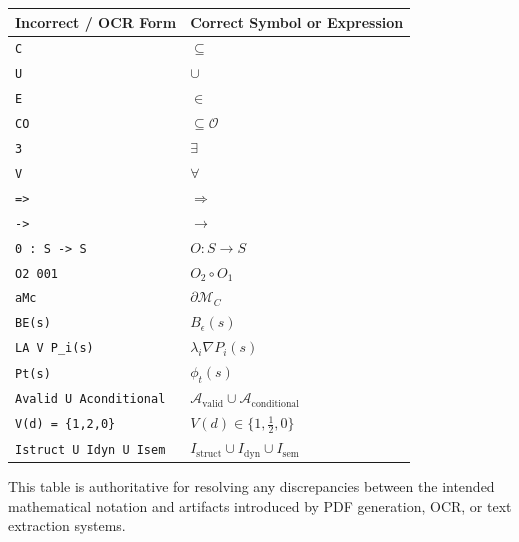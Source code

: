 \documentclass[12pt]{article}
\begin{document}
\begin{center}
\begin{tabular}{ll}
\textbf{Incorrect / OCR Form} & \textbf{Correct Symbol or Expression} \\
\hline
\texttt{C} & $\subseteq$ \\
\texttt{U} & $\cup$ \\
\texttt{E} & $\in$ \\
\texttt{CO} & $\subseteq \mathcal{O}$ \\
\texttt{3} & $\exists$ \\
\texttt{V} & $\forall$ \\
\texttt{=>} & $\Rightarrow$ \\
\texttt{->} & $\to$ \\
\texttt{0 : S -> S} & $O : S \to S$ \\
\texttt{O2 001} & $O_2 \circ O_1$ \\
\texttt{aMc} & $\partial \mathcal{M}_C$ \\
\texttt{BE(s)} & $B_\epsilon(s)$ \\
\texttt{LA V P\_i(s)} & $\lambda_i \nabla P_i(s)$ \\
\texttt{Pt(s)} & $\phi_t(s)$ \\
\texttt{Avalid U Aconditional} & $\mathcal{A}_{\mathrm{valid}} \cup \mathcal{A}_{\mathrm{conditional}}$ \\
\texttt{V(d) = \{1,2,0\}} & $V(d) \in \{1, \tfrac12, 0\}$ \\
\texttt{Istruct U Idyn U Isem} & $I_{\mathrm{struct}} \cup I_{\mathrm{dyn}} \cup I_{\mathrm{sem}}$ \\
\end{tabular}
\end{center}

This table is authoritative for resolving any discrepancies between the intended
mathematical notation and artifacts introduced by PDF generation, OCR, or text
extraction systems.
\end{document}
